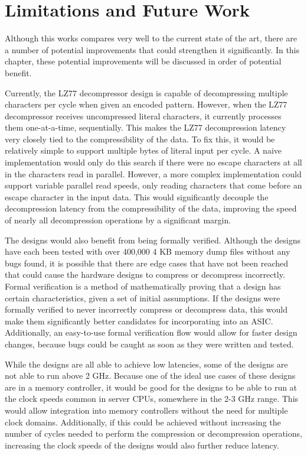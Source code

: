 \documentclass[doublespace,nopageskip]{VTthesis}
\begin{document}
\chapter{Limitations and Future Work} \label{ch:discussion}
Although this works compares very well to the current state of the art, there are a number of potential improvements that could strengthen it significantly. In this chapter, these potential improvements will be discussed in order of potential benefit.

Currently, the LZ77 decompressor design is capable of decompressing multiple characters per cycle when given an encoded pattern. However, when the LZ77 decompressor receives uncompressed literal characters, it currently processes them one-at-a-time, sequentially. This makes the LZ77 decompression latency very closely tied to the compressibility of the data. To fix this, it would be relatively simple to support multiple bytes of literal input per cycle. A naive implementation would only do this search if there were no escape characters at all in the characters read in parallel. However, a more complex implementation could support variable parallel read speeds, only reading characters that come before an escape character in the input data. This would significantly decouple the decompression latency from the compressibility of the data, improving the speed of nearly all decompression operations by a significant margin.

The designs would also benefit from being formally verified. Although the designs have each been tested with over 400,000 4 KB memory dump files without any bugs found, it is possible that there are edge cases that have not been reached that could cause the hardware designs to compress or decompress incorrectly. Formal verification is a method of mathematically proving that a design has certain characteristics, given a set of initial assumptions. If the designs were formally verified to never incorrectly compress or decompress data, this would make them significantly better candidates for incorporating into an ASIC. Additionally, an easy-to-use formal verification flow would allow for faster design changes, because bugs could be caught as soon as they were written and tested.

While the designs are all able to achieve low latencies, some of the designs are not able to run above 2 GHz. Because one of the ideal use cases of these designs are in a memory controller, it would be good for the designs to be able to run at the clock speeds common in server CPUs, somewhere in the 2-3 GHz range. This would allow integration into memory controllers without the need for multiple clock domains. Additionally, if this could be achieved without increasing the number of cycles needed to perform the compression or decompression operations, increasing the clock speeds of the designs would also further reduce latency.
\end{document}
